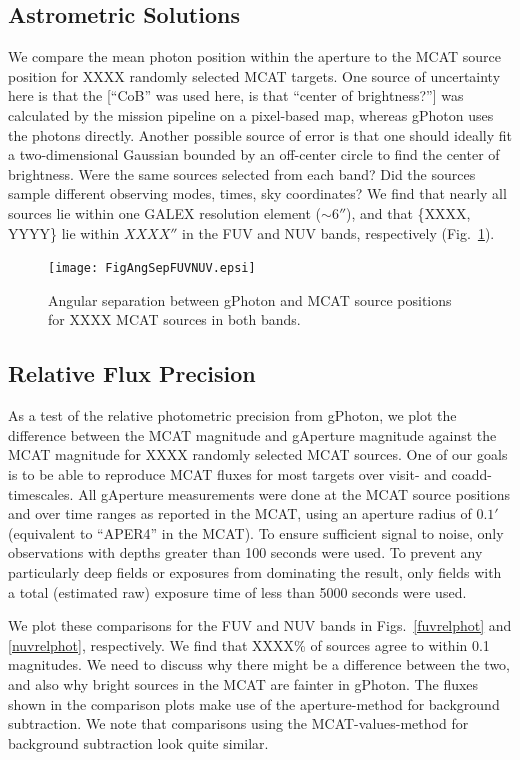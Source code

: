 \documentclass[5p]{elsarticle}
\begin{document}
\subsection{Astrometric Solutions}
We compare the mean photon position within the aperture to the MCAT source position for {\color{red}XXXX} randomly selected MCAT targets. One source of uncertainty here is that the {\color{red}[``CoB'' was used here, is that ``center of brightness?'']} was calculated by the mission pipeline on a pixel-based map, whereas gPhoton uses the photons directly. Another possible source of error is that one should ideally fit a two-dimensional Gaussian bounded by an off-center circle to find the center of brightness.  {\color{red}Were the same sources selected from each band?  Did the sources sample different observing modes, times, sky coordinates?}  We find that nearly all sources lie within one GALEX resolution element ($\sim 6''$), and that \{{\color{red}XXXX, YYYY}\} lie within {\color{red}$XXXX''$} in the FUV and NUV bands, respectively (Fig.\ \ref{fuvnuvastrometry}).

\begin{figure}
\texttt{[image: FigAngSepFUVNUV.epsi]}
\caption{Angular separation between gPhoton and MCAT source positions for {\color{red}XXXX} MCAT sources in both bands. \label{fuvnuvastrometry}}
\end{figure}

\subsection{Relative Flux Precision}
As a test of the relative photometric precision from gPhoton, we plot the difference between the MCAT magnitude and gAperture magnitude against the MCAT magnitude for {\color{red}XXXX} randomly selected MCAT sources.  One of our goals is to be able to reproduce MCAT fluxes for most targets over visit- and coadd-timescales.  All gAperture measurements were done at the MCAT source positions and over time ranges as reported in the MCAT, using an aperture radius of $0.1'$ (equivalent to ``APER4'' in the MCAT). To ensure sufficient signal to noise, only observations with depths greater than 100 seconds were used. To prevent any particularly deep fields or exposures from dominating the result, only fields with a total (estimated raw) exposure time of less than 5000 seconds were used.

We plot these comparisons for the FUV and NUV bands in Figs.\ \ref{fuvrelphot} and \ref{nuvrelphot}, respectively.  We find that {\color{red}XXXX\%} of sources agree to within 0.1 magnitudes.  {\color{red}We need to discuss why there might be a difference between the two, and also why bright sources in the MCAT are fainter in gPhoton.}  The fluxes shown in the comparison plots make use of the aperture-method for background subtraction.  We note that comparisons using the MCAT-values-method for background subtraction look quite similar.
\end{document}
